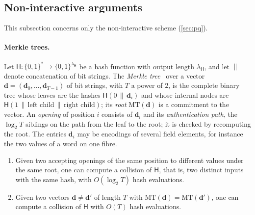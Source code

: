\subsection{Non-interactive arguments}\label{sec:proofs:bcs}

This subsection concerns only the non-interactive scheme (\cref{sec:pq}).

\paragraph{Merkle trees.}
Let $\mathsf{H} : \{0,1\}^* \to \{0,1\}^{\lambda_{\mathsf{H}}}$ be a hash function with output length $\lambda_{\mathsf{H}}$, and let $\|$ denote concatenation of bit strings.
The \emph{Merkle tree}~\cite{Mer89} over a vector $\mathbf{d} = (\mathbf{d}_0,\dots,\mathbf{d}_{T-1})$ of bit strings, with $T$ a power of $2$, is the complete binary tree whose leaves are the hashes $\mathsf{H}(0 \,\|\, \mathbf{d}_i)$ and whose internal nodes are $\mathsf{H}(1 \,\|\, \text{left child} \,\|\, \text{right child})$; its \emph{root} $\mathrm{MT}(\mathbf{d})$ is a commitment to the vector.
An \emph{opening} of position $i$ consists of $\mathbf{d}_i$ and its \emph{authentication path}, the $\log_2 T$ siblings on the path from the leaf to the root; it is checked by recomputing the root.
The entries $\mathbf{d}_i$ may be encodings of several field elements, for instance the two values of a word on one fibre.

\begin{lemma}\label{lem:merkle}
\begin{enumerate}
  \item Given two accepting openings of the same position to different values under the same root, one can compute a collision of $\mathsf{H}$, that is, two distinct inputs with the same hash, with $O(\log_2 T)$ hash evaluations.
  \item Given two vectors $\mathbf{d} \ne \mathbf{d}'$ of length $T$ with $\mathrm{MT}(\mathbf{d}) = \mathrm{MT}(\mathbf{d}')$, one can compute a collision of $\mathsf{H}$ with $O(T)$ hash evaluations.
\end{enumerate}
\end{lemma}

